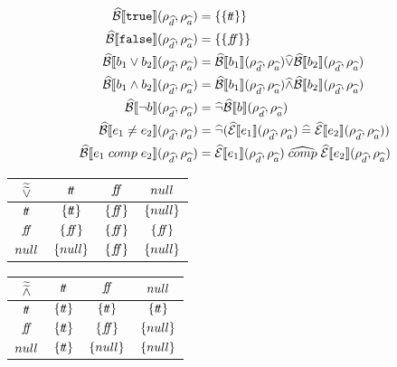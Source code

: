 \begin{align}\label{eq:abstract-bool-semantics}
    \absboolsem{\texttt{true}}(\rho_{\ab{d}}, \rho_{\ab{a}}) &= \{\{\true\}\} \\
    \absboolsem{\texttt{false}}(\rho_{\ab{d}}, \rho_{\ab{a}}) &= \{\{\false\}\} \\
    \absboolsem{b_1 \lor b_2}(\rho_{\ab{d}}, \rho_{\ab{a}}) &= \absboolsem{b_1}(\rho_{\ab{d}}, \rho_{\ab{a}}) \ab{\lor} \absboolsem{b_2}(\rho_{\ab{d}}, \rho_{\ab{a}}) \\
    \absboolsem{b_1 \land b_2}(\rho_{\ab{d}}, \rho_{\ab{a}}) &= \absboolsem{b_1}(\rho_{\ab{d}}, \rho_{\ab{a}}) \ab{\land} \absboolsem{b_2}(\rho_{\ab{d}}, \rho_{\ab{a}}) \\
    \absboolsem{\neg b}(\rho_{\ab{d}}, \rho_{\ab{a}}) &= \ab{\neg} \absboolsem{b}(\rho_{\ab{d}}, \rho_{\ab{a}}) \\
    \absboolsem{e_1 \neq e_2}(\rho_{\ab{d}}, \rho_{\ab{a}}) &= \ab{\neg}(\absexpsem{e_1}(\rho_{\ab{d}}, \rho_{\ab{a}}) \;\ab{=}\; \absexpsem{e_2}(\rho_{\ab{d}}, \rho_{\ab{a}})) \\
    \absboolsem{e_1 \;comp\; e_2}(\rho_{\ab{d}}, \rho_{\ab{a}}) &= \absexpsem{e_1}(\rho_{\ab{d}}, \rho_{\ab{a}}) \;\ab{\comp}\; \absexpsem{e_2}(\rho_{\ab{d}}, \rho_{\ab{a}}) \\
\end{align}

\begin{table}[H]
    \centering
    \begin{tabular}{c|ccc}
        $\widetilde{\widetilde{\lor}}$ & $t\!t$ & $f\!\!f$ & $null$ \\
        \hline
        $t\!t$ & $\{t\!t\}$ & $\{f\!\!f\}$ & $\{null\}$ \\
        $f\!\!f$ & $\{f\!\!f\}$ & $\{f\!\!f\}$ & $\{f\!\!f\}$ \\
        $null$ & $\{null\}$ & $\{f\!\!f\}$ & $\{null\}$ \\
    \end{tabular}
    \label{tab:aaablor}
\end{table}

\begin{table}[H]
    \centering
    \begin{tabular}{c|ccc}
        $\widetilde{\widetilde{\land}}$ & $t\!t$ & $f\!\!f$ & $null$ \\
        \hline
        $t\!t$ & $\{t\!t\}$ & $\{t\!t\}$ & $\{t\!t\}$ \\
        $f\!\!f$ & $\{t\!t\}$ & $\{f\!\!f\}$ & $\{null\}$ \\
        $null$ & $\{t\!t\}$ & $\{null\}$ & $\{null\}$ \\
    \end{tabular}
    \label{tab:aaabland}
\end{table}

